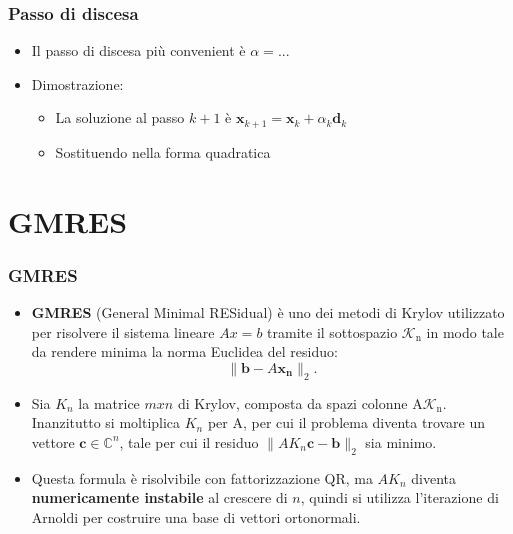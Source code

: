 \documentclass[10pt]{beamer}
\begin{document}
\begin{frame} \frametitle{Passo di discesa}
\begin{itemize}
\item Il passo di discesa più convenient è $\alpha=...$
\item Dimostrazione:
\begin{itemize}
    \item La soluzione al passo $k+1$ è $\mathbf{x}_{k+1}=\mathbf{x}_{k}+\alpha_k\mathbf{d}_{k}$
    \item Sostituendo nella forma quadratica
    \end{itemize}

\end{itemize}
\end{frame}

\section{GMRES}\label{sec:sec3}

\begin{frame} \frametitle{GMRES}
\begin{itemize}
    \item \textbf{GMRES} (General Minimal RESidual) è uno dei metodi di Krylov utilizzato per risolvere il sistema lineare $Ax = b$ tramite il sottospazio
    $\mathcal{K}_\mathrm{n}$ in modo tale da rendere minima la norma Euclidea del residuo: $$\|\mathbf{b}-A\mathbf{x_n}\|_2.$$
    
    \item Sia $K_n$ la matrice $m x n$ di Krylov, composta da spazi colonne A$\mathcal{K}_\mathrm{n}$. Inanzitutto si moltiplica $K_n$ per A, per cui il problema diventa trovare un vettore $\mathbf{c}\in\mathbb{C}^n$, tale per cui il residuo $\|AK_n\mathbf{c}-\mathbf{b}\|_2$ sia minimo. 
    
    \item Questa formula è risolvibile con fattorizzazione QR, ma $AK_n$ diventa \textbf{numericamente instabile} al crescere di $n$, quindi si utilizza \alert{l'iterazione di Arnoldi} per costruire una base di vettori ortonormali.

\end{itemize}
\end{frame}
\end{document}
